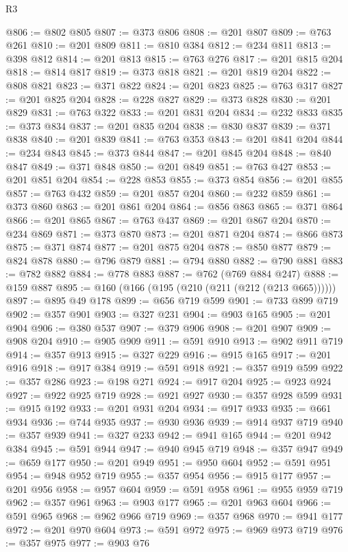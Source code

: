 \begin{lexlean}{R3}
\begin{coremodule}
@806 := @802 @805
@807 := @373 @806
@808 := @201 @807
@809 := @763 @261
@810 := @201 @809
@811 := @810 @384
@812 := @234 @811
@813 := @398 @812
@814 := @201 @813
@815 := @763 @276
@817 := @201 @815 @204
@818 := @814 @817
@819 := @373 @818
@821 := @201 @819 @204
@822 := @808 @821
@823 := @371 @822
@824 := @201 @823
@825 := @763 @317
@827 := @201 @825 @204
@828 := @228 @827
@829 := @373 @828
@830 := @201 @829
@831 := @763 @322
@833 := @201 @831 @204
@834 := @232 @833
@835 := @373 @834
@837 := @201 @835 @204
@838 := @830 @837
@839 := @371 @838
@840 := @201 @839
@841 := @763 @353
@843 := @201 @841 @204
@844 := @234 @843
@845 := @373 @844
@847 := @201 @845 @204
@848 := @840 @847
@849 := @371 @848
@850 := @201 @849
@851 := @763 @427
@853 := @201 @851 @204
@854 := @228 @853
@855 := @373 @854
@856 := @201 @855
@857 := @763 @432
@859 := @201 @857 @204
@860 := @232 @859
@861 := @373 @860
@863 := @201 @861 @204
@864 := @856 @863
@865 := @371 @864
@866 := @201 @865
@867 := @763 @437
@869 := @201 @867 @204
@870 := @234 @869
@871 := @373 @870
@873 := @201 @871 @204
@874 := @866 @873
@875 := @371 @874
@877 := @201 @875 @204
@878 := @850 @877
@879 := @824 @878
@880 := @796 @879
@881 := @794 @880
@882 := @790 @881
@883 := @782 @882
@884 := @778 @883
@887 := @762 (@769 @884 @247)
@888 := @159 @887
@895 := @160 (@166 (@195 (@210 (@211 (@212 (@213 @665))))))
@897 := @895 @49 @178
@899 := @656 @719 @599
@901 := @733 @899 @719
@902 := @357 @901
@903 := @327 @231
@904 := @903 @165
@905 := @201 @904
@906 := @380 @537
@907 := @379 @906
@908 := @201 @907
@909 := @908 @204
@910 := @905 @909
@911 := @591 @910
@913 := @902 @911 @719
@914 := @357 @913
@915 := @327 @229
@916 := @915 @165
@917 := @201 @916
@918 := @917 @384
@919 := @591 @918
@921 := @357 @919 @599
@922 := @357 @286
@923 := @198 @271
@924 := @917 @204
@925 := @923 @924
@927 := @922 @925 @719
@928 := @921 @927
@930 := @357 @928 @599
@931 := @915 @192
@933 := @201 @931 @204
@934 := @917 @933
@935 := @661 @934
@936 := @744 @935
@937 := @930 @936
@939 := @914 @937 @719
@940 := @357 @939
@941 := @327 @233
@942 := @941 @165
@944 := @201 @942 @384
@945 := @591 @944
@947 := @940 @945 @719
@948 := @357 @947
@949 := @659 @177
@950 := @201 @949
@951 := @950 @604
@952 := @591 @951
@954 := @948 @952 @719
@955 := @357 @954
@956 := @915 @177
@957 := @201 @956
@958 := @957 @604
@959 := @591 @958
@961 := @955 @959 @719
@962 := @357 @961
@963 := @903 @177
@965 := @201 @963 @604
@966 := @591 @965
@968 := @962 @966 @719
@969 := @357 @968
@970 := @941 @177
@972 := @201 @970 @604
@973 := @591 @972
@975 := @969 @973 @719
@976 := @357 @975
@977 := @903 @76

\end{coremodule}
\end{lexlean}
